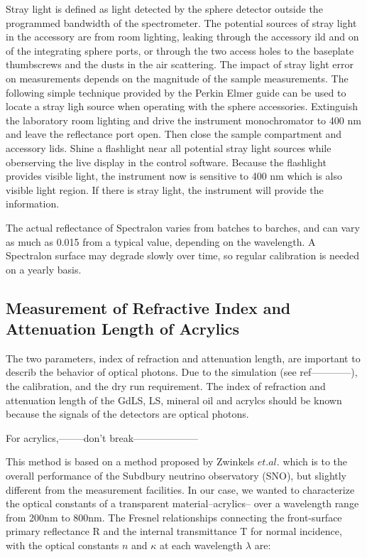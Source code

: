 Stray light is defined as light detected by the sphere detector outside the programmed bandwidth of the spectrometer.
The potential sources of stray light in the accessory are from
room lighting, leaking through the accessory ild and on of the integrating sphere ports, or
through the two access holes to the baseplate thumbscrews and the dusts in the air scattering.
The impact of stray light error on measurements depends on the magnitude of the sample measurements.
The following simple technique provided by the Perkin Elmer guide can be used to locate a stray ligh source when operating with
the sphere accessories. Extinguish the laboratory room lighting and drive the instrument monochromator to 400 nm and leave the reflectance port open.
Then close the sample compartment and accessory lids. Shine a flashlight near all potential stray light sources while oberserving the live display in the
control software. Because the flashlight provides visible light, the instrument now is sensitive to 400 nm which is also visible light region. If there is stray light, the instrument will provide the information.

The actual reflectance of Spectralon varies from batches to barches, and can vary as much as 0.015 from a typical value, depending on the wavelength.
A Spectralon surface may degrade slowly over time, so regular calibration is needed on a yearly basis.


\subsection {Measurement of Refractive Index and Attenuation Length of Acrylics}
\label {sec:RTMethod}

The two parameters, index of refraction and attenuation length, are important
to describ the behavior of optical photons. Due to the simulation (see ref------------),
the calibration, and the dry run requirement. The index of refraction and attenuation length
of the GdLS, LS, mineral oil and acrylcs should be known because the signals of the detectors
are optical photons.

For acrylics,--------don't break--------------------

This method is based on a method proposed by Zwinkels $et. al.$ \cite{RTMethod} which
is to the overall performance of the Subdbury neutrino observatory (SNO),
but slightly different from the measurement facilities. In our case, we wanted to characterize the optical constants of a
transparent material--acrylics-- over a wavelength range from 200nm to 800nm. The Fresnel relationships connecting the front-surface
primary reflectance R and the internal transmittance T for normal incidence, with the optical constants $n$ and $\kappa$ at each wavelength $\lambda$
are:


